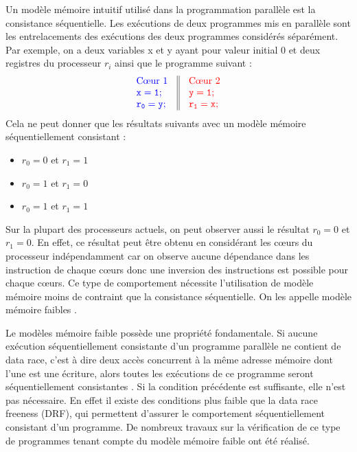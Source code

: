 \documentclass[12pt,a4paper]{article}
\begin{document}
Un modèle mémoire intuitif utilisé dans la programmation parallèle est la consistance séquentielle. Les exécutions de deux programmes mis en parallèle sont les entrelacements des exécutions des deux programmes considérés séparément. Par exemple, on a deux variables x et y ayant pour valeur initial 0 et deux registres du processeur $r_i$ ainsi que le programme suivant :
\[
\begin{array}{c||c}
  \begin{array}{l}
    \textcolor[rgb]{0,0,1}{\text{C\oe{}ur 1}} \\
    \textcolor[rgb]{0,0,1}{\mathtt{x = 1;}} \\
    \textcolor[rgb]{0,0,1}{\mathtt{r_0 = y;}} \\
  \end{array} &
  \begin{array}{l}
    \textcolor[rgb]{1,0,0}{\text{C\oe{}ur 2}} \\
    \textcolor[rgb]{1,0,0}{\mathtt{y = 1;}} \\
    \textcolor[rgb]{1,0,0}{\mathtt{r_1 = x;}} \\
  \end{array}
\end{array}
\]
Cela ne peut donner que les résultats suivants avec un modèle mémoire séquentiellement consistant :
\begin{itemize}
	\item $r_0 = 0$ et $r_1 = 1$
	\item $r_0 = 1$ et $r_1 = 0$
	\item $r_0 = 1$ et $r_1 = 1$
\end{itemize} 
Sur la plupart des processeurs actuels, on peut observer aussi le résultat $r_0 = 0$ et $r_1 = 0$. En effet, ce résultat peut être obtenu en considérant les cœurs du processeur indépendamment car on observe aucune dépendance dans les instruction de chaque cœurs donc une inversion des instructions est possible pour chaque cœurs. Ce type de comportement nécessite l'utilisation de modèle mémoire moins de contraint que la consistance séquentielle. On les appelle modèle mémoire faibles \cite{Adve:1996:SMC:619013.620590}. 

Le modèles mémoire faible possède une propriété fondamentale. Si aucune exécution séquentiellement consistante d'un programme parallèle ne contient de data race, c'est à dire deux accès concurrent  à la même adresse mémoire dont l'une est une écriture, alors toutes les exécutions de ce programme seront séquentiellement consistantes \cite{Saraswat:2007:TMM:1229428.1229469}.
Si la condition précédente est suffisante, elle n'est pas nécessaire. En effet il existe des conditions plus faible que la data race freeness (DRF), qui permettent d'assurer le comportement séquentiellement consistant d'un programme. De nombreux travaux sur la vérification de ce type de programmes tenant compte du modèle mémoire faible ont été réalisé.
\end{document}
